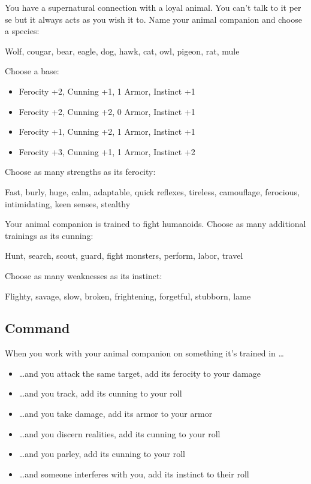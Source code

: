  You have a supernatural connection with a loyal animal. You can't talk to it per se but it always acts as you wish it to. Name your animal companion and choose a species:


 Wolf, cougar, bear, eagle, dog, hawk, cat, owl, pigeon, rat, mule


 Choose a base:
\begin{itemize}
\item Ferocity +2, Cunning +1, 1 Armor, Instinct +1
\item Ferocity +2, Cunning +2, 0 Armor, Instinct +1
\item Ferocity +1, Cunning +2, 1 Armor, Instinct +1
\item Ferocity +3, Cunning +1, 1 Armor, Instinct +2

\end{itemize}


 Choose as many strengths as its ferocity:


 Fast, burly, huge, calm, adaptable, quick reflexes, tireless, camouflage, ferocious, intimidating, keen senses, stealthy


 Your animal companion is trained to fight humanoids. Choose as many additional trainings as its cunning:


 Hunt, search, scout, guard, fight monsters, perform, labor, travel


 Choose as many weaknesses as its instinct:


 Flighty, savage, slow, broken, frightening, forgetful, stubborn, lame
\subsection{Command}


 When you work with your animal companion on something it's trained in \ldots 
\begin{itemize}
\item  \ldots and you attack the same target, add its ferocity to your damage
\item  \ldots and you track, add its cunning to your roll
\item  \ldots and you take damage, add its armor to your armor
\item  \ldots and you discern realities, add its cunning to your roll
\item  \ldots and you parley, add its cunning to your roll
\item  \ldots and someone interferes with you, add its instinct to their roll

\end{itemize}
